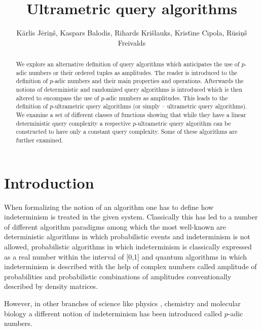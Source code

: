 \documentclass{llncs}
\begin{document}
\title{Ultrametric query algorithms}


\author{
K\= arlis J\= eri\c n\v s,
Kaspars Balodis,
Rihards Kri\v slauks,
Krist\= \i ne C\= \i pola,
R\= usi\c n\v s Freivalds}



\maketitle

\begin{abstract} 
We explore an alternative definition of query algorithms which anticipates the use of $p$-adic numbers or their ordered tuples as amplitudes. The reader is introduced to the definition of $p$-adic numbers and their main properties and operations. Afterwards the notions of deterministic and randomized query algorithms is introduced which is then altered to encompass the use of $p$-adic numbers as amplitudes. This leads to the definition of $p$-ultrametric query algorithms (or simply – ultrametric query algorithms). We examine a set of different classes of functions showing that while they have a linear deterministic query complexity a respective $p$-ultrametric query algorithm can be constructed to have only a constant query complexity. Some of these algorithms are further examined.
\end{abstract} 

\section{Introduction}
When formalizing the notion of an algorithm one has to define how indeterminism is treated in the given system. Classically this has led to a number of different algorithm paradigms among which the most well-known are deterministic algorithms in which probabilistic events and indeterminism is not allowed, probabilistic algorithms in which indeterminism is classically expressed as a real number within the interval of [0,1] and quantum algorithms in which indeterminism is described with the help of complex numbers called amplitude of probabilities and probabilistic combinations of amplitudes conventionally described by density matrices.

However, in other branches of science like physics \cite{VSV95}, chemistry \cite{Koz06} and molecular biology \cite{Dra09} a different notion of indeterminism has been introduced called $p$-adic numbers.
\end{document}
